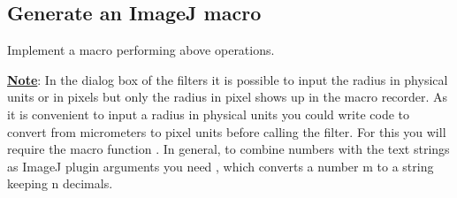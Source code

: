 \subsection{Generate an ImageJ macro}

Implement a macro performing above operations.

\underline{\textbf{Note}}: In the dialog box of the filters it is possible to input the radius in physical units or in pixels but only the radius in pixel shows up in the macro recorder. As it is convenient to input a radius in physical units you could write code to convert from micrometers to pixel units before calling the filter. For this you will require the macro function . In general, to combine numbers with the text strings as ImageJ plugin arguments you need , which converts a number m to a string keeping n decimals.